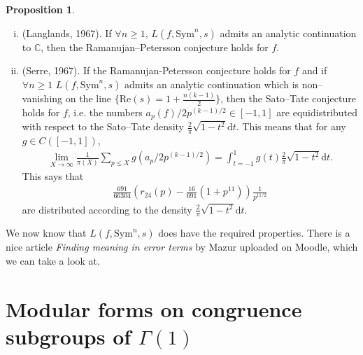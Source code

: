 \documentclass{article}
\theoremstyle{definition}
\newtheorem{prop}[theorem]{Proposition}
\begin{document}
\begin{prop}
    \begin{enumerate}[(i)]
        \item (Langlands, 1967). If $\forall n\ge 1$, $L(f, \text{Sym}^n, s)$ admits an analytic continuation to $\mathbb{C}$, then the Ramanujan--Petersson conjecture holds for $f$.
        \item (Serre, 1967). If the Ramanujan-Petersson conjecture holds for $f$ and if $\forall n\ge 1$ $L(f, \text{Sym}^n, s)$ admits an analytic continuation which is non--vanishing on the line $\{\text{Re}(s)=1+\frac{n(k-1)}{2}\}$, then the Sato--Tate conjecture holds for $f$, i.e. the numbers $a_{p}(f)/2p^{(k-1)/2} \in [-1,1]$ are equidistributed with respect to the Sato--Tate density $\frac{2}{\pi}\sqrt{1-t^2}\mathrm{d}t$. This means that for any $g \in C([-1,1])$, \begin{align*}
            \lim_{X \to \infty}\frac{1}{\pi(X)} \sum_{p\le X}^{} g(a_p/2p^{(k-1)/2}) = \int_{t = -1}^{1} g(t)\frac{2}{\pi}\sqrt{1-t^2}\mathrm{d}t.
        \end{align*}
        This says that
        \begin{align*}
            \frac{691}{66304} \left(r_{24}(p) - \frac{16}{691}(1+p^{11})\right) \frac{1}{p^{11/2}}
        \end{align*}
        are distributed according to the density $\frac{2}{\pi}\sqrt{1-t^2}\mathrm{d}t$.
    \end{enumerate}
\end{prop}
We now know that $L(f,\text{Sym}^n,s)$ does have the required properties. There is a nice article \textit{Finding meaning in error terms} by Mazur uploaded on Moodle, which we can take a look at.

\section{Modular forms on congruence subgroups of $\Gamma(1)$}
\end{document}
